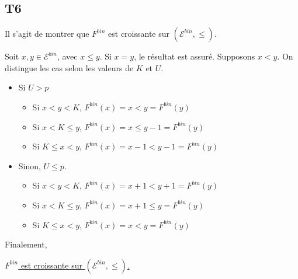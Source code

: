 \documentclass[a4paper,11pt]{article}
\def \E{\mathcal{E}}
\begin{document}
\subsection*{T6}

Il s'agit de montrer que $F^{bin}$ est croissante sur $(\E^{bin},\le)$.

Soit $x,y \in \E^{bin}$, avec $x\le y$. Si $x=y$, le résultat est assuré. Supposons $x<y$. On distingue les cas selon les valeurs de $K$ et $U$. 

\begin{itemize}
\item[\textbullet] Si $U>p$
	\begin{itemize}
	\item Si $x<y<K$, $F^{bin}(x) = x < y = F^{bin}(y)$
	\item Si $x<K\le y$, $F^{bin}(x) = x \le y-1 = F^{bin}(y)$
	\item Si $K\le x < y$, $F^{bin}(x) = x - 1 < y - 1 = F^{bin}(y)$
	\end{itemize}
\item[\textbullet] Sinon, $U\le p$.
	\begin{itemize}
	\item Si $x<y<K$, $F^{bin}(x) = x + 1 < y + 1= F^{bin}(y)$
	\item Si $x<K\le y$, $F^{bin}(x) = x +1 \le y = F^{bin}(y)$
	\item Si $K\le x < y$, $F^{bin}(x) = x < y = F^{bin}(y)$
	\end{itemize}
\end{itemize}
\vspace{0.5cm}

Finalement,
\begin{center}
 \underline{$F^{bin}$ est croissante sur  $(\E^{bin},\le)$.}
\end{center}
\end{document}
